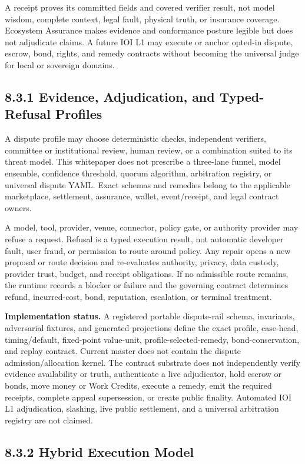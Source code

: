 \documentclass[
  11pt,
]{article}
\begin{document}
A receipt proves its committed fields and covered verifier result, not model
wisdom, complete context, legal fault, physical truth, or insurance coverage.
Ecosystem Assurance makes evidence and conformance posture legible but does not
adjudicate claims. A future IOI L1 may execute or anchor opted-in dispute,
escrow, bond, rights, and remedy contracts without becoming the universal
judge for local or sovereign domains.

\hypertarget{evidence-adjudication-and-typed-refusal-profiles}{%
\subsection{8.3.1 Evidence, Adjudication, and Typed-Refusal
Profiles}\label{evidence-adjudication-and-typed-refusal-profiles}}

A dispute profile may choose deterministic checks, independent verifiers,
committee or institutional review, human review, or a combination suited to
its threat model. This whitepaper does not prescribe a three-lane funnel,
model ensemble, confidence threshold, quorum algorithm, arbitration registry,
or universal dispute YAML. Exact schemas and remedies belong to the applicable
marketplace, settlement, assurance, wallet, event/receipt, and legal contract
owners.

A model, tool, provider, venue, connector, policy gate, or authority provider
may refuse a request. Refusal is a typed execution result, not automatic
developer fault, user fraud, or permission to route around policy. Any repair
opens a new proposal or route decision and re-evaluates authority, privacy,
data custody, provider trust, budget, and receipt obligations. If no admissible
route remains, the runtime records a blocker or failure and the governing
contract determines refund, incurred-cost, bond, reputation, escalation, or
terminal treatment.

\textbf{Implementation status.} A registered portable dispute-rail schema,
invariants, adversarial fixtures, and generated projections define the exact
profile, case-head, timing/default, fixed-point value-unit,
profile-selected-remedy, bond-conservation, and replay contract. Current
master does not contain the dispute admission/allocation kernel. The contract
substrate does not independently verify evidence availability or truth,
authenticate a live adjudicator, hold escrow or bonds, move money or Work
Credits, execute a remedy, emit the required receipts, complete appeal
supersession, or create public finality. Automated IOI L1 adjudication,
slashing, live public settlement, and a universal arbitration registry are not
claimed.
\hypertarget{hybrid-execution-model}{%
\subsection{8.3.2 Hybrid Execution Model}\label{hybrid-execution-model}}
\end{document}
